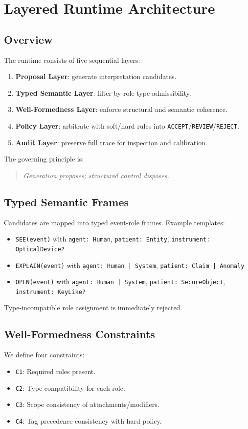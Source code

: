 \documentclass[11pt,a4paper]{article}
\begin{document}
\section{Layered Runtime Architecture}

\subsection{Overview}
The runtime consists of five sequential layers:
\begin{enumerate}[leftmargin=*, itemsep=2pt]
  \item \textbf{Proposal Layer}: generate interpretation candidates.
  \item \textbf{Typed Semantic Layer}: filter by role-type admissibility.
  \item \textbf{Well-Formedness Layer}: enforce structural and semantic coherence.
  \item \textbf{Policy Layer}: arbitrate with soft/hard rules into \texttt{ACCEPT}/\texttt{REVIEW}/\texttt{REJECT}.
  \item \textbf{Audit Layer}: preserve full trace for inspection and calibration.
\end{enumerate}

The governing principle is:

\begin{quote}
\emph{Generation proposes; structured control disposes.}
\end{quote}

\subsection{Typed Semantic Frames}
Candidates are mapped into typed event-role frames. Example templates:
\begin{itemize}[leftmargin=*, itemsep=2pt]
  \item \texttt{SEE(event)} with \texttt{agent: Human}, \texttt{patient: Entity}, \texttt{instrument: OpticalDevice?}
  \item \texttt{EXPLAIN(event)} with \texttt{agent: Human | System}, \texttt{patient: Claim | Anomaly}
  \item \texttt{OPEN(event)} with \texttt{agent: Human | System}, \texttt{patient: SecureObject}, \texttt{instrument: KeyLike?}
\end{itemize}

Type-incompatible role assignment is immediately rejected.

\subsection{Well-Formedness Constraints}
We define four constraints:
\begin{itemize}[leftmargin=*, itemsep=2pt]
  \item \texttt{C1}: Required roles present.
  \item \texttt{C2}: Type compatibility for each role.
  \item \texttt{C3}: Scope consistency of attachments/modifiers.
  \item \texttt{C4}: Tag precedence consistency with hard policy.
\end{itemize}
\end{document}
